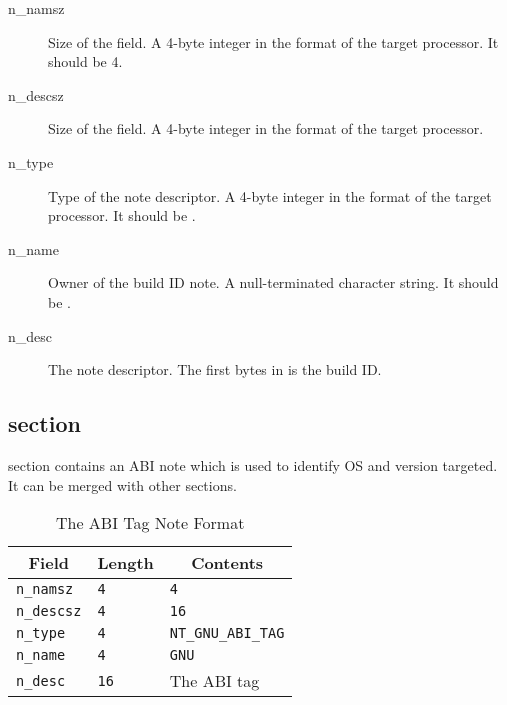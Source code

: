\begin{description}
 \item[n_namsz] Size of the  field.  A 4-byte integer in the
   format of the target processor.  It should be 4.
 \item[n_descsz] Size of the  field.  A 4-byte integer in the
   format of the target processor.
 \item[n_type] Type of the note descriptor.  A 4-byte integer in the format
   of the target processor.  It should be .
 \item[n_name] Owner of the build ID note.  A null-terminated character
   string.  It should be .
 \item[n_desc] The note descriptor.  The first  bytes in
    is the build ID.
\end{description}

\subsection{ section}
\label{sec_abi_tag}

 section contains an ABI note which is used to
identify OS and version targeted.  It can be merged with other
 sections.

\begin{table}[H]
\Hrule
 \caption{The ABI Tag Note Format}
 \label{format-abi_tag}
 \begin{center}
  \begin{tabular}[t]{l|l|l}
   \multicolumn{1}{c}{Field}
     & \multicolumn{1}{c}{Length}
       & \multicolumn{1}{c}{Contents} \\
   \hline
   \texttt{n_namsz} & \texttt{4} & \texttt{4} \\
   \texttt{n_descsz} & \texttt{4} & \texttt{16} \\
   \texttt{n_type} & \texttt{4} & \texttt{NT_GNU_ABI_TAG} \\
   \texttt{n_name} & \texttt{4} & \texttt{GNU} \\
   \texttt{n_desc} & \texttt{16} & The ABI tag\\
  \end{tabular}
 \end{center}
\Hrule
\end{table}

